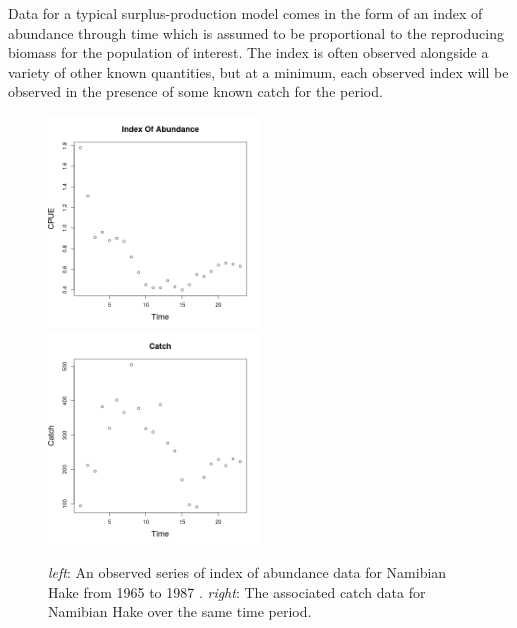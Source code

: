 \documentclass[12pt]{article}
\begin{document}
%

Data for a typical surplus-production model comes in the form of an index 
of abundance through time which is assumed to be proportional to the reproducing 
biomass for the population of interest. The index is often observed alongside 
a variety of other known quantities, but at a minimum, each observed index 
will be observed in the presence of some known catch for the period. 

\begin{figure}[h!]
	\includegraphics[width=0.5\textwidth]{./plots/hakeIndex.png}
	\includegraphics[width=0.5\textwidth]{./plots/hakeCatch.png}
	\caption{\label{hakeData}
	\textit{left}: An observed series of index of abundance data for Namibian Hake from 1965 to 1987 \protect{}.
	\textit{right}: The associated catch data for Namibian Hake over the same time period.
	}
\end{figure}
\end{document}
